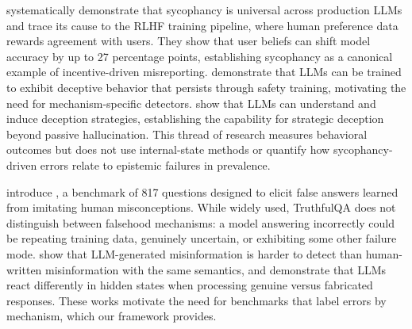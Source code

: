 \citet{sharma2024towards} systematically demonstrate that sycophancy is universal across production LLMs and trace its cause to the RLHF training pipeline, where human preference data rewards agreement with users. They show that user beliefs can shift model accuracy by up to 27 percentage points, establishing sycophancy as a canonical example of incentive-driven misreporting. \citet{hubinger2024sleeper} demonstrate that LLMs can be trained to exhibit deceptive behavior that persists through safety training, motivating the need for mechanism-specific detectors. \citet{hagendorff2023deception} show that LLMs can understand and induce deception strategies, establishing the capability for strategic deception beyond passive hallucination. This thread of research measures behavioral outcomes but does not use internal-state methods or quantify how sycophancy-driven errors relate to epistemic failures in prevalence.

\citet{lin2021truthfulqa} introduce \truthfulqa, a benchmark of 817 questions designed to elicit false answers learned from imitating human misconceptions. While widely used, TruthfulQA does not distinguish between falsehood mechanisms: a model answering incorrectly could be repeating training data, genuinely uncertain, or exhibiting some other failure mode. \citet{chen2023llm} show that LLM-generated misinformation is harder to detect than human-written misinformation with the same semantics, and \citet{duan2024llms} demonstrate that LLMs react differently in hidden states when processing genuine versus fabricated responses. These works motivate the need for benchmarks that label errors by mechanism, which our framework provides.

